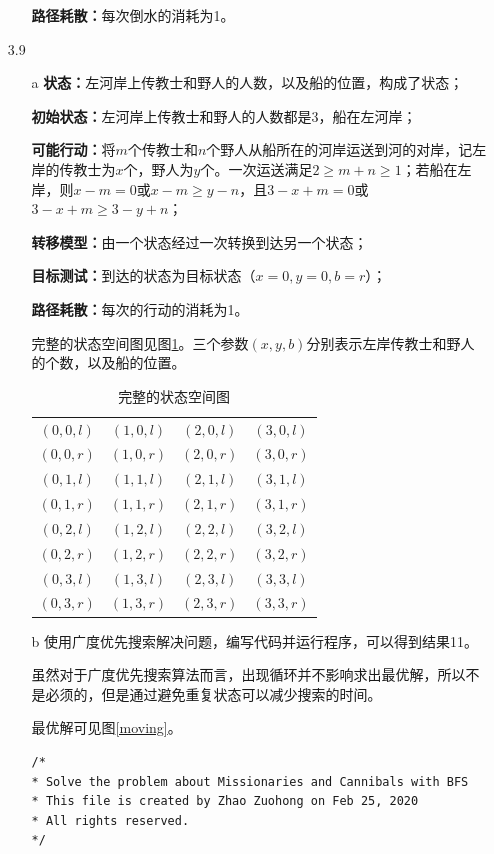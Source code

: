 \documentclass[UTF8,zihao=-4]{ctexart}
\begin{document}
\begin{itemize}
\begin{itemize}
			\textbf{路径耗散：}每次倒水的消耗为1。
		\end{itemize} 
		\item[3.9]
		\begin{itemize}
			\item[a]
			\textbf{状态：}左河岸上传教士和野人的人数，以及船的位置，构成了状态；
			
			\textbf{初始状态：}左河岸上传教士和野人的人数都是3，船在左河岸；

			\textbf{可能行动：}将$m$个传教士和$n$个野人从船所在的河岸运送到河的对岸，记左岸的传教士为$x$个，野人为$y$个。一次运送满足$2\geq m+n\geq 1$；若船在左岸，则$x-m=0$或$x-m\geq y-n$，且$3-x+m=0$或$3-x+m\geq 3-y+n$；
			
			\textbf{转移模型：}由一个状态经过一次转换到达另一个状态；

			\textbf{目标测试：}到达的状态为目标状态（$x=0,y=0,b=r$）；

			\textbf{路径耗散：}每次的行动的消耗为1。

			完整的状态空间图见图\ref{all}。三个参数$(x,y,b)$分别表示左岸传教士和野人的个数，以及船的位置。

			\begin{table}
				\centering
				\begin{tabular}{cccc}
					$(0,0,l)$ & $(1,0,l)$ & $(2,0,l)$ & $(3,0,l)$ \\
					$(0,0,r)$ & $(1,0,r)$ & $(2,0,r)$ & $(3,0,r)$ \\
					$(0,1,l)$ & $(1,1,l)$ & $(2,1,l)$ & $(3,1,l)$ \\
					$(0,1,r)$ & $(1,1,r)$ & $(2,1,r)$ & $(3,1,r)$ \\
					$(0,2,l)$ & $(1,2,l)$ & $(2,2,l)$ & $(3,2,l)$ \\
					$(0,2,r)$ & $(1,2,r)$ & $(2,2,r)$ & $(3,2,r)$ \\
					$(0,3,l)$ & $(1,3,l)$ & $(2,3,l)$ & $(3,3,l)$ \\
					$(0,3,r)$ & $(1,3,r)$ & $(2,3,r)$ & $(3,3,r)$ \\
				\end{tabular}
				\caption{完整的状态空间图}
				\label{all}
			\end{table}

			\item[b] 使用广度优先搜索解决问题，编写代码并运行程序，可以得到结果11。

			虽然对于广度优先搜索算法而言，出现循环并不影响求出最优解，所以不是必须的，但是通过避免重复状态可以减少搜索的时间。

			最优解可见图\ref{moving}。
			\begin{lstlisting}
/*
* Solve the problem about Missionaries and Cannibals with BFS
* This file is created by Zhao Zuohong on Feb 25, 2020
* All rights reserved.
*/


\end{lstlisting}
\end{itemize}
\end{itemize}
\end{document}

